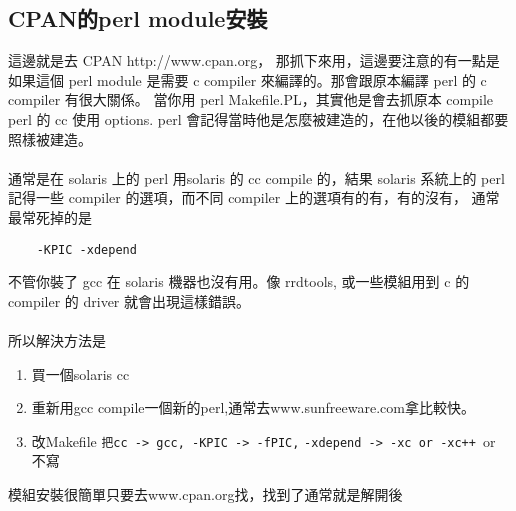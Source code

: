     \subsection{CPAN的perl module安裝}
    這邊就是去 CPAN http://www.cpan.org，
    那抓下來用，這邊要注意的有一點是如果這個 perl module 是需要
    c compiler 來編譯的。那會跟原本編譯 perl 的 c compiler 有很大關係。
    當你用 perl Makefile.PL，其實他是會去抓原本 compile perl 的 cc 使用 options.
    perl 會記得當時他是怎麼被建造的，在他以後的模組都要照樣被建造。
    \\\\
    通常是在 solaris 上的 perl 用solaris 的 cc compile 的，結果 solaris 系統上的
    perl 記得一些 compiler 的選項，而不同 compiler 上的選項有的有，有的沒有，
    通常最常死掉的是
    \begin{verbatim}
    -KPIC -xdepend
    \end{verbatim}
    不管你裝了 gcc 在 solaris 機器也沒有用。像 rrdtools, 或一些模組用到 c 的
    compiler 的 driver 就會出現這樣錯誤。
    \\\\
    所以解決方法是
    \begin{enumerate}
    \item 買一個solaris cc
    \item 重新用gcc compile一個新的perl,通常去www.sunfreeware.com拿比較快。
    \item 改Makefile \verb=把cc -> gcc, -KPIC -> -fPIC,= 
		     \verb=-xdepend -> -xc or -xc++ =or 不寫
    \end{enumerate}

    模組安裝很簡單只要去www.cpan.org找，找到了通常就是解開後

